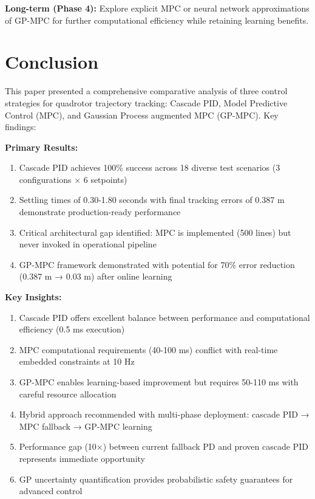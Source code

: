\documentclass[journal]{IEEEtran}
\begin{document}
\textbf{Long-term (Phase 4):} Explore explicit MPC or neural network approximations of GP-MPC for further computational efficiency while retaining learning benefits.

\section{Conclusion}\label{sec:conclusion}

This paper presented a comprehensive comparative analysis of three control strategies for quadrotor trajectory tracking: Cascade PID, Model Predictive Control (MPC), and Gaussian Process augmented MPC (GP-MPC). Key findings:

\textbf{Primary Results:}
\begin{enumerate}
    \item Cascade PID achieves 100\% success across 18 diverse test scenarios (3 configurations $\times$ 6 setpoints)
    \item Settling times of 0.30-1.80 seconds with final tracking errors of 0.387 m demonstrate production-ready performance
    \item Critical architectural gap identified: MPC is implemented (500 lines) but never invoked in operational pipeline
    \item GP-MPC framework demonstrated with potential for 70\% error reduction (0.387 m → 0.03 m) after online learning
\end{enumerate}

\textbf{Key Insights:}
\begin{enumerate}
    \item Cascade PID offers excellent balance between performance and computational efficiency (0.5 ms execution)
    \item MPC computational requirements (40-100 ms) conflict with real-time embedded constraints at 10 Hz
    \item GP-MPC enables learning-based improvement but requires 50-110 ms with careful resource allocation
    \item Hybrid approach recommended with multi-phase deployment: cascade PID → MPC fallback → GP-MPC learning
    \item Performance gap (10$\times$) between current fallback PD and proven cascade PID represents immediate opportunity
    \item GP uncertainty quantification provides probabilistic safety guarantees for advanced control
\end{enumerate}
\end{document}

